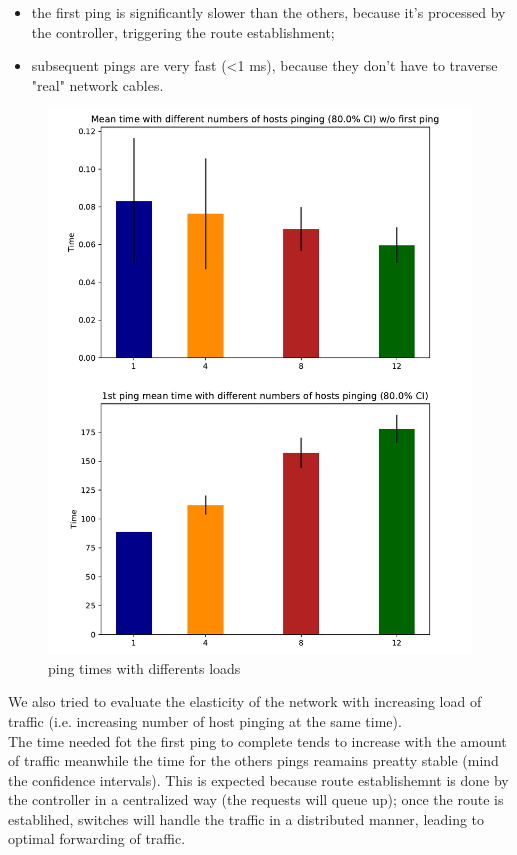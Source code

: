 \begin{itemize}
    \item the first ping is significantly slower than the others, because it's processed by the controller, triggering the route establishment;
    \item subsequent pings are very fast (<1 ms), because they don't have to traverse "real" network cables.
\end{itemize}
\newpage
\begin{figure}[h]
    \centering
    \includegraphics[width=.94\textwidth]{img/increasing_ping_time.pdf}
    \caption{ping times with differents loads}
\end{figure}
\noindent We also tried to evaluate the elasticity of the network with increasing load of traffic (i.e. increasing number of host pinging at the same time).\\
The time needed fot the first ping to complete tends to increase with the amount of traffic meanwhile the time for the others pings reamains preatty stable
(mind the confidence intervals). This is expected because route establishemnt is done by the controller in a centralized way (the requests will queue up);
once the route is establihed, switches will handle the traffic in a distributed manner, leading to optimal forwarding of traffic.